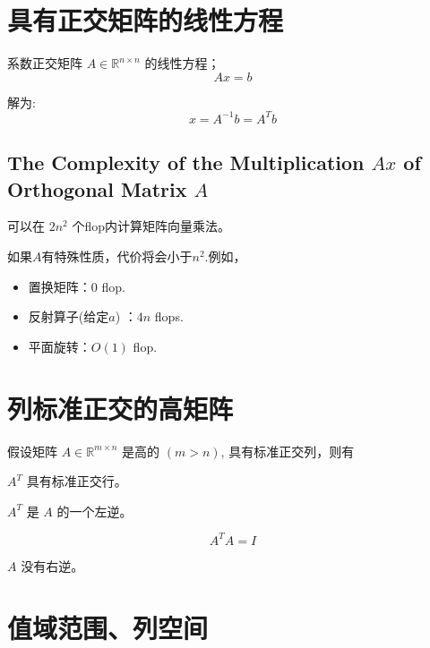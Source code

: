 \section{具有正交矩阵的线性方程}

系数正交矩阵 $ A \in \mathbb{R}^{n \times n} $ 的线性方程；
\begin{equation}
A x=b
\end{equation}

解为:
\begin{equation}
x=A^{-1} b=A^{T} b
\end{equation}


\subsection{The Complexity of the Multiplication $Ax$ of Orthogonal Matrix $A$}
\label{complexity:Qx}
可以在 $ 2  {n}^{2} $ 个flop内计算矩阵向量乘法。 

如果$A$有特殊性质，代价将会小于$n^2$.例如，

\begin{itemize}
    \item 置换矩阵：$0$ flop.
    \item 反射算子(给定$a$) ：$4n$ flops.
    \item 平面旋转：$O(1)$ flop.
\end{itemize}

\section{列标准正交的高矩阵}

\begin{theorem}
    假设矩阵 $ A \in \mathbb{R}^{m \times n} $ 是高的 $ ({m}>{n}) $, 具有标准正交列，则有

    $ A^{T} $ 具有标准正交行。
\end{theorem}

\begin{theorem}
    $ A^{T} $ 是 $ A $ 的一个左逆。

    \begin{equation}A^T A =I\end{equation}
\end{theorem}

\begin{theorem}
    $ A $ 没有右逆。
\end{theorem}

\section{值域范围、列空间}


